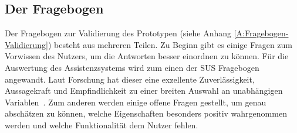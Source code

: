 \subsection{Der Fragebogen}
Der Fragebogen zur Validierung des Prototypen (siehe Anhang \ref{A:Fragebogen-Validierung}) besteht aus mehreren Teilen. Zu Beginn gibt es einige Fragen zum Vorwissen des Nutzers, um die Antworten besser einordnen zu können. Für die Auswertung des Assistenzsystems wird zum einen der SUS Fragebogen angewandt. Laut Forschung hat dieser eine \glqq exzellente Zuverlässigkeit, Aussagekraft und Empfindlichkeit zu einer breiten Auswahl an unabhängigen Variablen\grqq \ \citep[1150]{Lewis2018}. Zum anderen werden einige offene Fragen gestellt, um genau abschätzen zu können, welche Eigenschaften besonders positiv wahrgenommen werden und welche Funktionalität dem Nutzer fehlen. 

